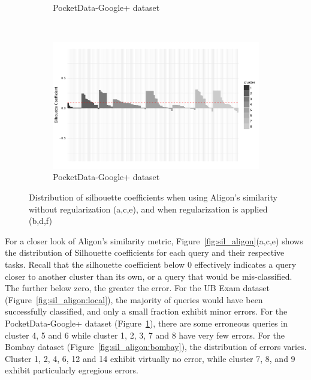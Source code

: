 \begin{figure}[h!]
\begin{subfigure}[b]{0.45\textwidth}
        \caption{PocketData-Google+ dataset}
        \label{fig:sil_aligon:googleplus}
    \end{subfigure}
    ~
    \begin{subfigure}[b]{0.45\textwidth}%
        \centering
        \includegraphics[width=\textwidth]{TKDE-QuerySimilarity/graphics/sil_googleplus_Aligon_regularization}
        \caption{PocketData-Google+ dataset}
        \label{fig:sil_aligon:googleplus_preprocess}
    \end{subfigure}
    \caption{Distribution of silhouette coefficients when using Aligon's similarity without regularization (a,c,e), and when regularization is applied (b,d,f)}
    \label{fig:sil_aligon}
    \label{fig:sil_aligon_preprocessed}
\end{figure}

For a closer look of Aligon's similarity metric, Figure~\ref{fig:sil_aligon}(a,c,e) shows the distribution of Silhouette coefficients for each query and their respective tasks.   
Recall that the silhouette coefficient below 0 effectively indicates a query closer to another cluster than its own, or a query that would be mis-classified.  The further below zero, the greater the error.  
For the UB Exam dataset (Figure~\ref{fig:sil_aligon:local}), the majority of queries would have been successfully classified, and only a small fraction exhibit minor errors.
For the PocketData-Google+ dataset (Figure~\ref{fig:sil_aligon:googleplus}), there are some erroneous queries in cluster 4, 5 and 6 while cluster 1, 2, 3, 7 and 8 have very few errors.
For the Bombay dataset (Figure~\ref{fig:sil_aligon:bombay}), the distribution of errors varies.  
Cluster 1, 2, 4, 6, 12 and 14 exhibit virtually no error, while cluster 7, 8, and 9 exhibit particularly egregious errors.

